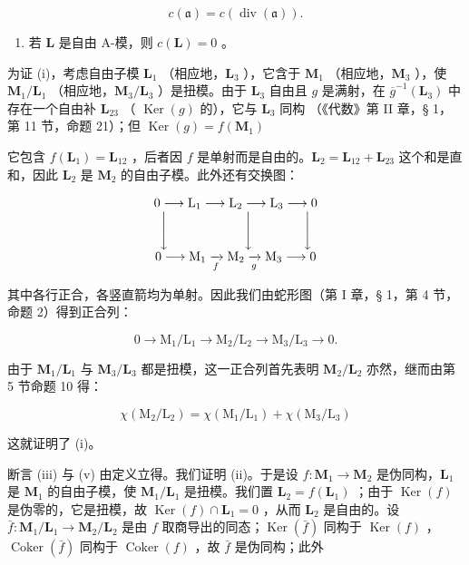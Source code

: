 \[
c (\mathfrak {a}) = c (\operatorname{div} (\mathfrak {a})).
\]

\begin{enumerate}
\def\labelenumi{(\alph{enumi})}
\setcounter{enumi}{21}
\tightlist
\item
  若 \(\mathbf{L}\) 是自由 A-模，则 \(c(\mathbf{L}) = 0\) 。
\end{enumerate}

为证 (i)，考虑自由子模 \(\mathbf{L}_1\) （相应地，\(\mathbf{L}_3\) ），它含于 \(\mathbf{M}_1\) （相应地，\(\mathbf{M}_3\) ），使 \(\mathbf{M}_1 / \mathbf{L}_1\) （相应地，\(\mathbf{M}_3 / \mathbf{L}_3\) ）是扭模。由于 \(\mathbf{L}_3\) 自由且 \(g\) 是满射，在 \(\overline{g}^{-1} (\mathbf{L}_3)\) 中存在一个自由补 \(\mathbf{L}_{23}\) （ \(\operatorname {Ker}(g)\) 的），它与 \(\mathbf{L}_3\) 同构 （《代数》第 II 章，§ 1，第 11 节，命题 21）；但 \(\operatorname {Ker}(g) = f(\mathbf{M}_1)\)

它包含 \(f(\mathbf{L}_1) = \mathbf{L}_{12}\) ，后者因 \(f\) 是单射而是自由的。\(\mathbf{L}_2 = \mathbf{L}_{12} + \mathbf{L}_{23}\) 这个和是直和，因此 \(\mathbf{L}_2\) 是 \(\mathbf{M}_2\) 的自由子模。此外还有交换图：

\[
\begin{array}{c} 0 \longrightarrow \mathrm{L} _ {1} \longrightarrow \mathrm{L} _ {2} \longrightarrow \mathrm{L} _ {3} \longrightarrow 0 \\ \Biggl \downarrow \qquad \qquad \qquad \Biggl \downarrow \qquad \qquad \Biggl \downarrow \\ 0 \longrightarrow \mathrm{M} _ {1} \xrightarrow [ f ]{} \mathrm{M} _ {2} \xrightarrow [ g ]{} \mathrm{M} _ {3} \longrightarrow 0 \end{array}
\]

其中各行正合，各竖直箭均为单射。因此我们由蛇形图（第 I 章，§ 1，第 4 节，命题 2）得到正合列：

\[
0 \rightarrow \mathrm{M} _ {1} / \mathrm{L} _ {1} \rightarrow \mathrm{M} _ {2} / \mathrm{L} _ {2} \rightarrow \mathrm{M} _ {3} / \mathrm{L} _ {3} \rightarrow 0.
\]

由于 \(\mathbf{M}_1 / \mathbf{L}_1\) 与 \(\mathbf{M}_3 / \mathbf{L}_3\) 都是扭模，这一正合列首先表明 \(\mathbf{M}_2 / \mathbf{L}_2\) 亦然，继而由第 5 节命题 10 得：

\[
\chi (\mathrm{M} _ {2} / \mathrm{L} _ {2}) = \chi (\mathrm{M} _ {1} / \mathrm{L} _ {1}) + \chi (\mathrm{M} _ {3} / \mathrm{L} _ {3})
\]

这就证明了 (i)。

断言 (iii) 与 (v) 由定义立得。我们证明 (ii)。于是设 \(f \colon \mathbf{M}_1 \to \mathbf{M}_2\) 是伪同构，\(\mathbf{L}_1\) 是 \(\mathbf{M}_1\) 的自由子模，使 \(\mathbf{M}_1 / \mathbf{L}_1\) 是扭模。我们置 \(\mathbf{L}_2 = f(\mathbf{L}_1)\) ；由于 \(\operatorname{Ker}(f)\) 是伪零的，它是扭模，故 \(\operatorname{Ker}(f) \cap \mathbf{L}_1 = 0\) ，从而 \(\mathbf{L}_2\) 是自由的。设 \(\bar{f} \colon \mathbf{M}_1 / \mathbf{L}_1 \to \mathbf{M}_2 / \mathbf{L}_2\) 是由 \(f\) 取商导出的同态；\(\operatorname{Ker}(\bar{f})\) 同构于 \(\operatorname{Ker}(f)\) ，\(\operatorname{Coker}(\bar{f})\) 同构于 \(\operatorname{Coker}(f)\) ，故 \(\bar{f}\) 是伪同构；此外

